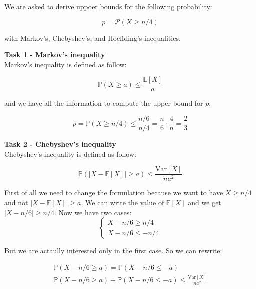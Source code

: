 \documentclass[a4paper,12pt]{article}
\begin{document}
We are asked to derive uppoer bounds for the following probability:

\begin{equation}
	p = \mathcal{P}(X \geq n/4)
\end{equation}

with Markov's, Chebyshev's, and Hoeffding's inequalities.

\vspace{1em}
\noindent\textbf{Task 1 - Markov's inequality}\\

Markov's inequality is defined as follow:

\begin{equation}
	\mathbb{P}(X \geq a) \leq \frac{\mathbb{E}[X]}{a}
\end{equation}

and we have all the information to compute the upper bound for $p$:

\begin{equation}
	p = \mathbb{P}(X \geq n/4) \leq \frac{n/6}{n/4} = \frac{n}{6} \cdot \frac{4}{n} = \frac{2}{3}
\end{equation}

\vspace{1em}
\noindent\textbf{Task 2 - Chebyshev's inequality}\\

Chebyshev's inequality is defined as follow:

\begin{equation}
	\mathbb{P}(|X - \mathbb{E}[X]| \geq a) \leq \frac{\text{Var}[X]}{na^2}
\end{equation}

First of all we need to change the formulation because we want to have $X \geq
	n/4$ and not $|X - \mathbb{E}[X]| \geq a$. We can write the value of
$\mathbb{E}[X]$ and we get $|X - n/6| \geq n/4$. Now we have two cases:
\begin{equation}
	\begin{cases}
		X - n/6 \geq n/4 \\
		X - n/6 \leq -n/4
	\end{cases}
\end{equation}

But we are actaully interested only in the first case. So we can rewrite:

\begin{align}
	\mathbb{P}(X - n/6 \geq a)                                = \mathbb{P}(X - n/6 \leq -a) \\
	\mathbb{P}(X - n/6 \geq a) + \mathbb{P}(X - n/6 \leq -a) \leq \frac{\text{Var}[X]}{na^2}
\end{align}
\end{document}
